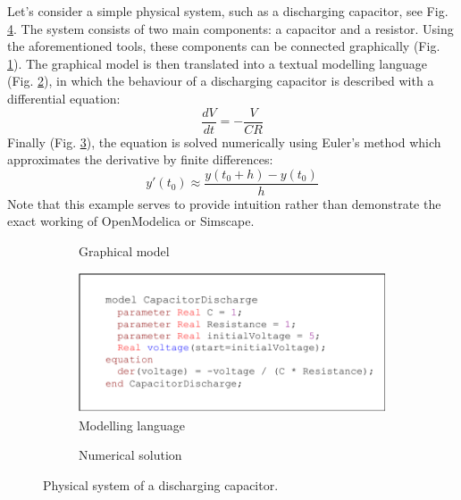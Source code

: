 \documentclass[conference]{IEEEtran}
\begin{document}
Let's consider a simple physical system, such as a discharging capacitor, see Fig. \ref{capacitor-discharge}.
The system consists of two main components: a capacitor and a resistor.
Using the aforementioned tools, these components can be connected graphically (Fig. \ref{cd:graphical-model}).
The graphical model is then translated into a textual modelling language (Fig. \ref{cd:modeling-language}), in which the behaviour of a discharging capacitor is described with a differential equation:
\[
\frac{dV}{dt} = -\frac{V}{CR}
\]
Finally (Fig. \ref{cd:numerical-solution}), the equation is solved numerically using Euler's method which approximates the derivative by finite differences:
\[
y'(t_0) \approx \frac{y(t_0+h) - y(t_0)}{h}
\]
Note that this example serves to provide intuition rather than demonstrate the exact working of OpenModelica or Simscape.

\begin{figure}[htbp]
  \centering
  \begin{subfigure}[b]{\linewidth}
    \centering
    
    \caption{Graphical model}
    \label{cd:graphical-model}
  \end{subfigure}
  
  \vspace{1em}
  
  \begin{subfigure}[b]{\linewidth}
    \centering
    \includegraphics[width=0.9\linewidth]{images/capacitor-discharge-code.drawio.pdf}
    \caption{Modelling language}
    \label{cd:modeling-language}
  \end{subfigure}
  
  \vspace{1em}
  
  \begin{subfigure}[b]{\linewidth}
    \centering
    
    \caption{Numerical solution}
    \label{cd:numerical-solution}
  \end{subfigure}
  
  \caption{Physical system of a discharging capacitor.}
  \label{capacitor-discharge}
\end{figure}
\end{document}
